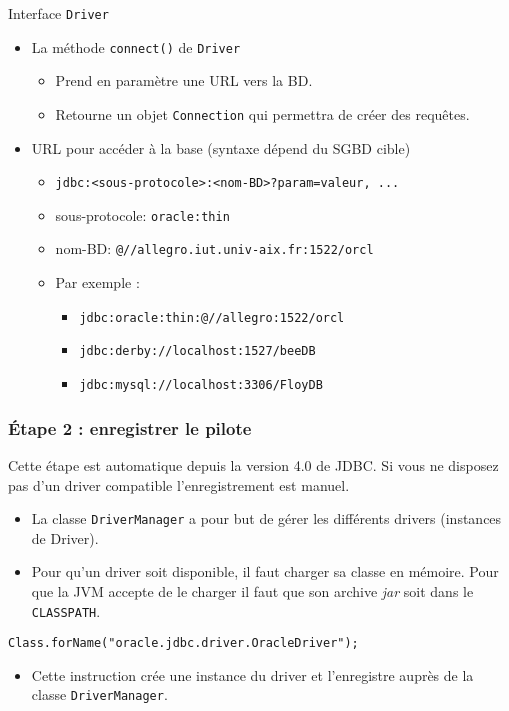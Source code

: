 \documentclass[xcolor=pdftex,x11names,table]{beamer}
\begin{document}
		\lstset{basicstyle=\normalsize}
		\begin{frame}{Interface \lstinline$Driver$}
			\begin{itemize}
	      \item La méthode \lstinline$connect()$ de \lstinline$Driver$
	   		  \begin{itemize}
	      		\item Prend en paramètre une URL vers la BD.
	      		\item Retourne un objet \lstinline$Connection$ qui permettra de créer des requêtes.
	      	\end{itemize}
	      \item URL pour accéder à la base (syntaxe dépend du SGBD cible)
	      	\begin{itemize}
	      		\item \texttt{jdbc:<sous-protocole>:<nom-BD>?param=valeur, ...}
	      		\item sous-protocole: \texttt{oracle:thin}
	      		\item nom-BD: \texttt{@//allegro.iut.univ-aix.fr:1522/orcl}
	      		\item Par exemple :
					  	\begin{itemize}
					  		\item \texttt{jdbc:oracle:thin:@//allegro:1522/orcl} 
					  		\item \texttt{jdbc:derby://localhost:1527/beeDB}
					  		\item \texttt{jdbc:mysql://localhost:3306/FloyDB}
					  	\end{itemize}
	      	\end{itemize}
			\end{itemize}
		\end{frame}

    \begin{frame}
    \frametitle{Étape 2 : enregistrer le pilote}
    	Cette étape est automatique depuis la version 4.0 de JDBC. Si vous ne disposez pas d'un driver 
    	compatible l'enregistrement est manuel.
    	\begin{itemize}
	      \item La classe \lstinline$DriverManager$ a pour but de gérer les différents drivers (instances de Driver).
	      \item Pour qu'un driver soit disponible, il faut charger sa classe en mémoire. Pour que la JVM accepte 
	      de le charger il faut que son archive \emph{jar} soit dans le \texttt{CLASSPATH}.
    	\end{itemize}
    	\pause
    	\vfill
    	\begin{block}{}
    	\lstinline$Class.forName("oracle.jdbc.driver.OracleDriver");$
    	\end{block}
    	\vfill
    	\pause
    	\begin{itemize}
	      \item Cette instruction crée une instance du driver et l'enregistre auprès de la classe \lstinline$DriverManager$.
    	\end{itemize}
    \end{frame}
    
\end{document}
